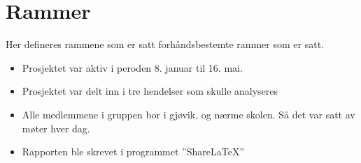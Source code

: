 \section{Rammer}
\label{sec:rammer}
Her defineres rammene som er satt forhåndsbestemte rammer som er satt. 

\begin{itemize}
    \item Prosjektet var aktiv i peroden 8. januar til 16. mai.
    \item Prosjektet var delt inn i tre hendelser som skulle analyseres
    \item Alle medlemmene i gruppen bor i gjøvik, og nærme skolen. Så det var satt av møter hver dag.
    \item Rapporten ble skrevet i programmet ''ShareLaTeX''
\end{itemize}